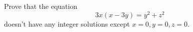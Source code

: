 Prove that the equation
$$3x(x-3y)=y^2+z^2$$doesn't have any integer solutions except $x=0,y=0,z=0$.